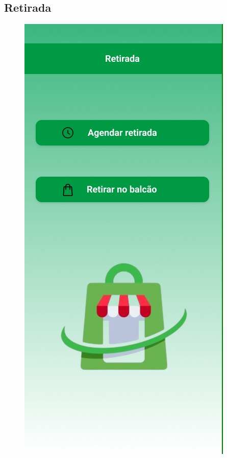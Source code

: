 \documentclass[12pt,oneside,a4paper,article]{abntex2}
\begin{document}
 \subsection{Retirada}
\begin{figure}[H]
        \centering
        \includegraphics[width=0.5\linewidth]{imagens-template//telas/retirada.jpg}
        \label{fig:placeholder}
    \end{figure}
    
\end{document}

